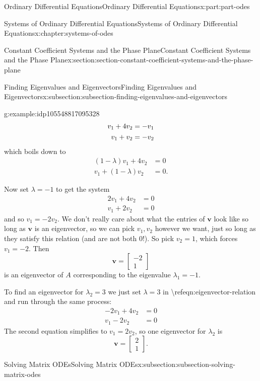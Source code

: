 \documentclass[twoside,10pt,]{book}
\numberwithin{equation}{part}
\renewcommand{\vec}[1]{\mathbf{#1}}
\newcommand{\amp}{&}
\begin{document}
\begin{partptx}{Ordinary Differential Equations}{}{Ordinary Differential Equations}{}{}{x:part:part-odes}
\begin{chapterptx}{Systems of Ordinary Differential Equations}{}{Systems of Ordinary Differential Equations}{}{}{x:chapter:systems-of-odes}
\begin{sectionptx}{Constant Coefficient Systems and the Phase Plane}{}{Constant Coefficient Systems and the Phase Plane}{}{}{x:section:section-constant-coefficient-systems-and-the-phase-plane}
\begin{subsectionptx}{Finding Eigenvalues and Eigenvectors}{}{Finding Eigenvalues and Eigenvectors}{}{}{x:subsection:subsection-finding-eigenvalues-and-eigenvectors}
\begin{example}{}{g:example:idp105548817095328}
\begin{align}
v_{1}+4v_{2}\amp =-v_{1}\notag\\
v_{1}+v_{2} \amp = -v_{2}\notag
\end{align}
which boils down to%
\begin{align*}
(1-\lambda)v_{1}+4v_{2} \amp = 0\\
v_{1} + (1-\lambda)v_{2} \amp = 0.
\end{align*}
%
\par
Now set \(\lambda = -1\) to get the system%
\begin{align*}
2v_{1} + 4v_{2} \amp = 0\\
v_{1} + 2v_{2} \amp = 0
\end{align*}
and so \(v_{1} = -2v_{2}\). We don't really care about what the entries of \(\vec{v}\) look like so long as \(\vec{v}\) is an eigenvector, so we can pick \(v_{1},v_{2}\) however we want, just so long as they satisfy this relation (and are not both \(0\)!). So pick \(v_{2} = 1\), which forces \(v_{1} = -2\). Then%
\begin{equation*}
\vec{v} = \begin{bmatrix}-2\\1\end{bmatrix}
\end{equation*}
is an eigenvector of \(A\) corresponding to the eigenvalue \(\lambda_{1} = -1\).%
\par
To find an eigenvector for \(\lambda_{2} = 3\) we just set \(\lambda  = 3\) in \textbackslash{}ref\textbraceleft{}eqn:eigenvector-relation\textbraceright{} and run through the same process:%
\begin{align*}
-2v_{1}+4v_{2} \amp = 0\\
v_{1} - 2v_{2} \amp = 0
\end{align*}
The second equation simplifies to \(v_{1} = 2v_{2}\), so one eigenvector for \(\lambda_{2}\) is%
\begin{equation*}
\vec{v} = \begin{bmatrix}2 \\ 1\end{bmatrix}.
\end{equation*}
%
\end{example}
\end{subsectionptx}
%
%
\typeout{************************************************}
\typeout{************************************************}
%
\begin{subsectionptx}{Solving Matrix ODEs}{}{Solving Matrix ODEs}{}{}{x:subsection:subsection-solving-matrix-odes}

\end{subsectionptx}
\end{sectionptx}
\end{chapterptx}
\end{partptx}
\end{document}
